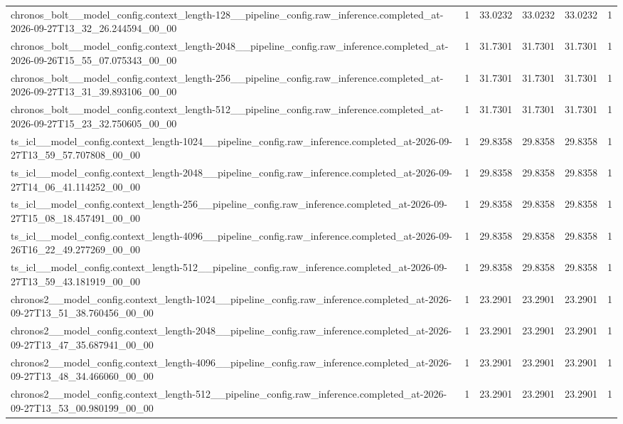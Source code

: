 \begin{tabular}{llllll}
chronos\_bolt\_\_model\_config.context\_length-128\_\_pipeline\_config.raw\_inference.completed\_at-2026-09-27T13\_32\_26.244594\_00\_00 & 1 & 33.0232 & 33.0232 & 33.0232 & 1 \\
chronos\_bolt\_\_model\_config.context\_length-2048\_\_pipeline\_config.raw\_inference.completed\_at-2026-09-26T15\_55\_07.075343\_00\_00 & 1 & 31.7301 & 31.7301 & 31.7301 & 1 \\
chronos\_bolt\_\_model\_config.context\_length-256\_\_pipeline\_config.raw\_inference.completed\_at-2026-09-27T13\_31\_39.893106\_00\_00 & 1 & 31.7301 & 31.7301 & 31.7301 & 1 \\
chronos\_bolt\_\_model\_config.context\_length-512\_\_pipeline\_config.raw\_inference.completed\_at-2026-09-27T15\_23\_32.750605\_00\_00 & 1 & 31.7301 & 31.7301 & 31.7301 & 1 \\
ts\_icl\_\_model\_config.context\_length-1024\_\_pipeline\_config.raw\_inference.completed\_at-2026-09-27T13\_59\_57.707808\_00\_00 & 1 & 29.8358 & 29.8358 & 29.8358 & 1 \\
ts\_icl\_\_model\_config.context\_length-2048\_\_pipeline\_config.raw\_inference.completed\_at-2026-09-27T14\_06\_41.114252\_00\_00 & 1 & 29.8358 & 29.8358 & 29.8358 & 1 \\
ts\_icl\_\_model\_config.context\_length-256\_\_pipeline\_config.raw\_inference.completed\_at-2026-09-27T15\_08\_18.457491\_00\_00 & 1 & 29.8358 & 29.8358 & 29.8358 & 1 \\
ts\_icl\_\_model\_config.context\_length-4096\_\_pipeline\_config.raw\_inference.completed\_at-2026-09-26T16\_22\_49.277269\_00\_00 & 1 & 29.8358 & 29.8358 & 29.8358 & 1 \\
ts\_icl\_\_model\_config.context\_length-512\_\_pipeline\_config.raw\_inference.completed\_at-2026-09-27T13\_59\_43.181919\_00\_00 & 1 & 29.8358 & 29.8358 & 29.8358 & 1 \\
chronos2\_\_model\_config.context\_length-1024\_\_pipeline\_config.raw\_inference.completed\_at-2026-09-27T13\_51\_38.760456\_00\_00 & 1 & 23.2901 & 23.2901 & 23.2901 & 1 \\
chronos2\_\_model\_config.context\_length-2048\_\_pipeline\_config.raw\_inference.completed\_at-2026-09-27T13\_47\_35.687941\_00\_00 & 1 & 23.2901 & 23.2901 & 23.2901 & 1 \\
chronos2\_\_model\_config.context\_length-4096\_\_pipeline\_config.raw\_inference.completed\_at-2026-09-27T13\_48\_34.466060\_00\_00 & 1 & 23.2901 & 23.2901 & 23.2901 & 1 \\
chronos2\_\_model\_config.context\_length-512\_\_pipeline\_config.raw\_inference.completed\_at-2026-09-27T13\_53\_00.980199\_00\_00 & 1 & 23.2901 & 23.2901 & 23.2901 & 1 \\

\end{tabular}
